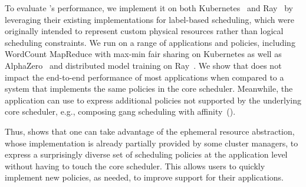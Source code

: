 To evaluate \name{}'s performance, we implement it on both Kubernetes~\cite{kubernetes} and Ray~\cite{ray-osdi} by leveraging their existing implementations 
for label-based scheduling, which were originally intended to represent custom physical resources rather than logical scheduling constraints.
We run \name{} on a range of applications and policies, including  WordCount MapReduce with max-min fair sharing on Kubernetes as well as
AlphaZero~\cite{silver2016alphago} and distributed model training on Ray~\cite{ray-osdi}. We show that \name{} does not impact the end-to-end performance of most applications when compared to a system that implements the same policies in the core scheduler. Meanwhile, the application can use \name{} to express additional policies not supported by the underlying core scheduler, e.g., composing gang scheduling with affinity~(). %

Thus, \name{} shows that one can take advantage of the ephemeral resource abstraction, whose implementation is already partially provided by some cluster managers, to express a surprisingly diverse set of scheduling policies at the application level without having to touch the core scheduler. This allows users to quickly implement new policies, as needed, to improve support for their applications.


